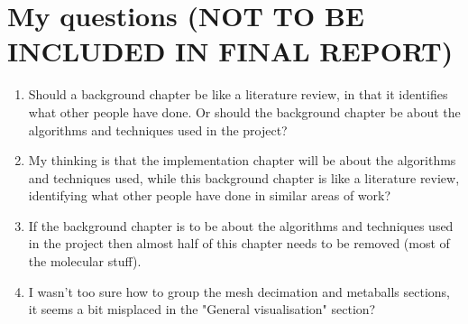 



\newpage
\section{My questions (NOT TO BE INCLUDED IN FINAL REPORT)}

\begin{enumerate}

  \item
  Should a background chapter be like a literature review, in that it
  identifies what other people have done. Or should the background chapter be
  about the algorithms and techniques used in the project?

  \item
  My thinking is that the implementation chapter will be about the algorithms
  and techniques used, while this background chapter is like a literature
  review, identifying what other people have done in similar areas of work?

  \item
  If the background chapter is to be about the algorithms and techniques used
  in the project then almost half of this chapter needs to be removed (most of
  the molecular stuff).

  \item
  I wasn't too sure how to group the mesh decimation and metaballs sections, it
  seems a bit misplaced in the "General visualisation" section?

\end{enumerate}

